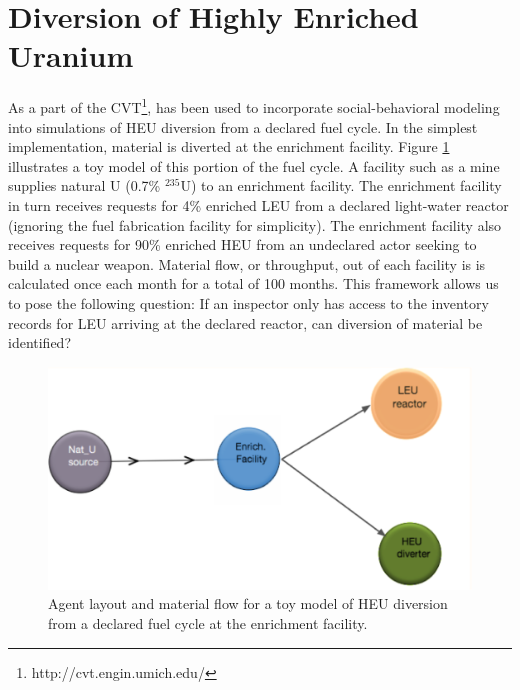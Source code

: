 \section{Diversion of Highly Enriched Uranium}
\label{s_results}
As a part of the \gls{CVT}\footnote{http://cvt.engin.umich.edu/}, \Cyclus has been used to incorporate social-behavioral modeling into simulations of \gls{HEU} diversion from a declared fuel cycle.  In the simplest implementation, material is diverted at the enrichment facility.  Figure \ref{fig:heu_layout} illustrates a toy model of this portion of the fuel cycle. A facility such as a mine supplies natural \gls{U} (0.7\% $^{235}$U) to an enrichment facility.  The enrichment facility in turn receives requests for 4\% enriched \gls{LEU} from a declared light-water reactor (ignoring the fuel fabrication facility for simplicity).  The enrichment facility also receives requests for 90\% enriched \gls{HEU} from an undeclared actor seeking to build a nuclear weapon. Material flow, or throughput, out of each facility is is calculated once each month for a total of 100 months.  This framework allows us to pose the following question: If an inspector only has access to the inventory records for LEU arriving at the declared reactor, can diversion of material be identified?

\begin{figure}%
\begin{center}
\includegraphics[natwidth=162bp,natheight=227bp, scale=0.7]{./figs/heu_cyclist_layout.png}
\end{center}
\caption{Agent layout and material flow for a toy model of \gls{HEU} diversion from a declared fuel cycle at the enrichment facility.}
\label{fig:heu_layout}
\end{figure}

